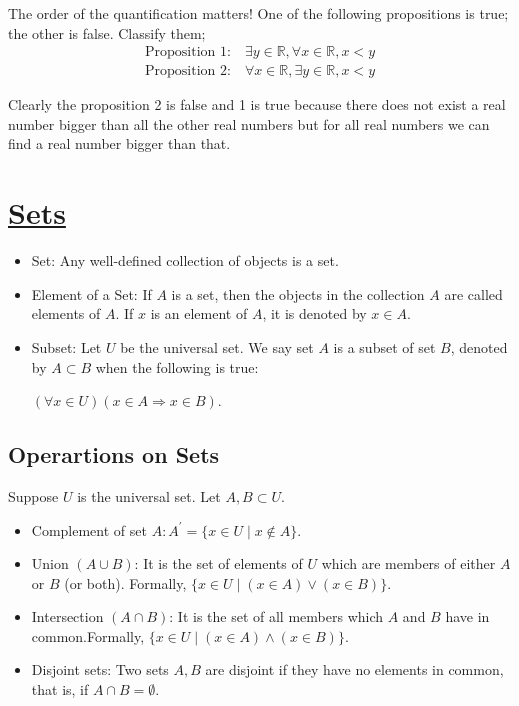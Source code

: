 \documentclass[12pt,a4paper]{article}
\begin{document}
 The order of the quantification matters! One of the following propositions is true; the other is false. Classify them;
 \begin{align*}
    \text{Proposition 1:} \quad \exists y \in \mathbb{R}, \forall x \in \mathbb{R}, x < y\\
    \text{Proposition 2:} \quad \forall x \in \mathbb{R}, \exists y \in \mathbb{R}, x < y
\end{align*}

   Clearly the proposition 2 is false and 1 is true because there does not exist a real number bigger than all the other real numbers but for all real numbers we can find a real number bigger than that.
   
   \pagebreak
    \section{ \underline{Sets} } 
    \begin{itemize}
    \item Set: Any well-defined collection of objects is a set.

    \item Element of a Set: If \(A\) is a set, then the objects in the collection \(A\) are called elements of \(A\). If \(x\) is an element of \(A\), it is denoted by \(x \in A\).

    \item Subset: Let \(U\) be the universal set. We say set \(A\) is a subset of set \(B\), denoted by \(A \subset B\) when the following is true:
    
    \((\forall x \in U)(x \in A \Rightarrow x \in B)\). 
    \end{itemize}

     \subsection{Operartions on Sets} 
     Suppose \(U\) is the universal set. Let \(A, B \subset U\).
     \begin{itemize}
        \item Complement of set \(A: A^{\prime}=\{x \in U \mid x \notin A\} \).
        \item  Union \((A \cup B)\): It is the set of elements of \(U\) which are members of either \(A\) or \(B\) (or both). Formally, \( \{ x \in U \mid(x \in A) \vee(x \in B)\} \).
        \item  Intersection \((A \cap B)\): It is the set of all members which \(A\) and \(B\) have in common.Formally, \( \{ x \in U \mid(x \in A) \wedge(x \in B)\} \).
        \item Disjoint sets: Two sets \(A, B\) are disjoint if they have no elements in common, that is, if \(A \cap B=\emptyset \).
     \end{itemize}
\end{document}
